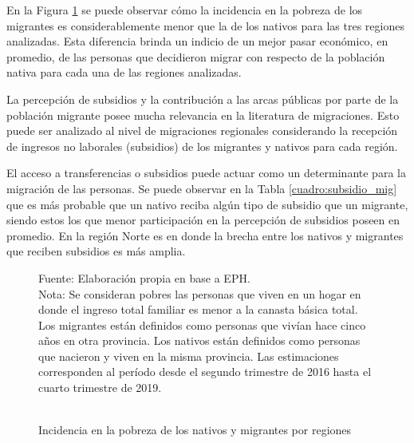 \documentclass[12pt,a4paper]{article}
\begin{document}
En la Figura \ref{figure:pobre_mig} se puede observar cómo la incidencia en la pobreza de los migrantes es considerablemente menor que la de los nativos para las tres regiones analizadas. Esta diferencia brinda un indicio de un mejor pasar económico, en promedio, de las personas que decidieron migrar con respecto de la población nativa para cada una de las regiones analizadas.

La percepción de subsidios y la contribución a las arcas públicas por parte de la población migrante posee mucha relevancia en la literatura de migraciones. Esto puede ser analizado al nivel de migraciones regionales considerando la recepción de ingresos no laborales (subsidios) de los migrantes y nativos para cada región. 

El acceso a transferencias o subsidios puede actuar como un determinante para la migración de las personas. Se puede observar en la Tabla \ref{cuadro:subsidio_mig} que es más probable que un nativo reciba algún tipo de subsidio que un migrante, siendo estos los que menor participación en la percepción de subsidios poseen en promedio. En la región Norte es en donde la brecha entre los nativos y migrantes que reciben subsidios es más amplia.

\newpage
\begin{figure}[ht!]
\begin{center}
\caption{\\Incidencia en la pobreza de los nativos y migrantes por regiones}
\label{figure:pobre_mig}
 
\end{center}
\begin{flushleft}
\begin{scriptsize}
Fuente: Elaboración propia en base a EPH.\\
Nota: Se consideran pobres las personas que viven en un hogar en donde el ingreso total familiar es menor a la canasta básica total. Los migrantes están definidos como personas que vivían hace cinco años en otra provincia. Los nativos están definidos como personas que nacieron y viven en la misma provincia. Las estimaciones corresponden al período desde el segundo trimestre de 2016 hasta el cuarto trimestre de 2019.\\
\end{scriptsize}
\end{flushleft}
\end{figure}
\end{document}
